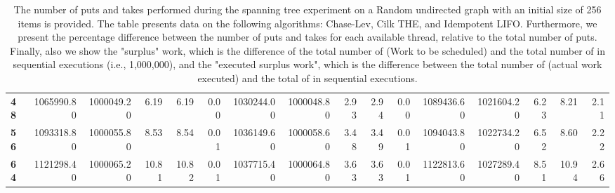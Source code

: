 \begin{table}[!ht]
{\begin{tabular}{lrrrrrrrrrrrrrrr}
\textbf{48} & 1065990.80 & 1000049.20 &           6.19 &        6.19 &                 0.00 & 1030244.00 & 1000048.80 &           2.93 &        2.94 &                 0.00 &      1089436.60 & 1021604.20 &           6.23 &        8.21 &                 2.11 \\
\textbf{56} & 1093318.80 & 1000055.80 &           8.53 &        8.54 &                 0.01 & 1036149.60 & 1000058.60 &           3.48 &        3.49 &                 0.01 &      1094043.80 & 1022734.20 &           6.52 &        8.60 &                 2.22 \\
\textbf{64} & 1121298.40 & 1000065.20 &          10.81 &       10.82 &                 0.01 & 1037715.40 & 1000064.80 &           3.63 &        3.63 &                 0.01 &      1122813.60 & 1027289.40 &           8.51 &       10.94 &                 2.66 \\
\bottomrule
\end{tabular}}
\label{difference-Random_undirected-256-CHASELEV-CILK-IDEMPOTENT_LIFO}
\caption{The number of puts and takes performed during the
    spanning tree experiment on a Random undirected graph with an initial size
    of 256 items is provided. The table presents data on the
    following algorithms: Chase-Lev, Cilk THE, and
    Idempotent LIFO. Furthermore, we present the percentage difference
    between the number of puts and takes for each available thread,
    relative to the total number of puts. Finally, also we show the
    "surplus" work, which is the difference of the total number of
    \Puts (Work to be scheduled) and the total number of \Puts in
    sequential executions (i.e., 1,000,000), and the "executed surplus
    work", which is the difference between the total number of \Takes
    (actual work executed) and the total of \Takes in sequential
    executions.}
\end{table}
